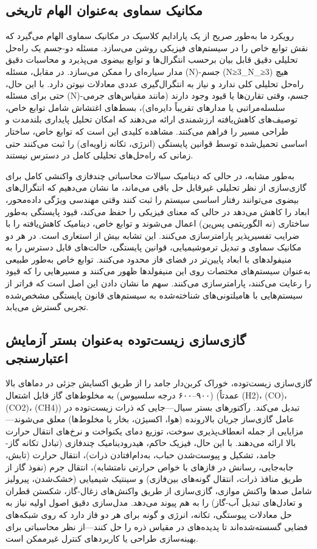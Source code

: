 \documentclass[12pt, a4paper]{article}
\begin{document}
\subsection{مکانیک سماوی به‌عنوان الهام تاریخی}

رویکرد ما به‌طور صریح از یک پارادایم کلاسیک در مکانیک سماوی الهام می‌گیرد که نقش توابع خاص را در سیستم‌های فیزیکی روشن می‌سازد. مسئله دو-جسم یک راه‌حل تحلیلی دقیق قابل بیان برحسب انتگرال‌ها و توابع بیضوی می‌پذیرد و محاسبات دقیق مدار سیاره‌ای را ممکن می‌سازد. در مقابل، مسئله \en(N)-جسم (N≥3\_N\_≥3) هیچ راه‌حل تحلیلی کلی ندارد و نیاز به انتگرال‌گیری عددی معادلات نیوتن دارد. با این حال، حتی برای مسئله \en(N)-جسم، وقتی تقارن‌ها یا قیود وجود دارند (مانند مقیاس‌های جرمی سلسله‌مراتبی یا مدارهای تقریباً دایره‌ای)، بسط‌های اغتشاش شامل توابع خاص، توصیف‌های کاهش‌یافته ارزشمندی ارائه می‌دهند که امکان تحلیل پایداری بلندمدت و طراحی مسیر را فراهم می‌کنند. مشاهده کلیدی این است که توابع خاص، ساختار اساسی تحمیل‌شده توسط قوانین پایستگی (انرژی، تکانه زاویه‌ای) را ثبت می‌کنند حتی زمانی که راه‌حل‌های تحلیلی کامل در دسترس نیستند.

به‌طور مشابه، در حالی که دینامیک سیالات محاسباتی چندفازی واکنشی کامل برای گازی‌سازی از نظر تحلیلی غیرقابل حل باقی می‌ماند، ما نشان می‌دهیم که انتگرال‌های بیضوی می‌توانند رفتار اساسی سیستم را ثبت کنند وقتی مهندسی ویژگی داده‌محور، ابعاد را کاهش می‌دهد در حالی که معنای فیزیکی را حفظ می‌کند، قیود پایستگی به‌طور ساختاری (نه الگوریتمی پس‌ین) اعمال می‌شوند و توابع خاص، دینامیک کاهش‌یافته را با ضرایب تفسیرپذیر پارامترسازی می‌کنند. این تشابه بیش از استعاری است. در هر دو مکانیک سماوی و تبدیل ترموشیمیایی، قوانین پایستگی، حالت‌های قابل دسترس را به منیفولدهای با ابعاد پایین‌تر در فضای فاز محدود می‌کنند. توابع خاص به‌طور طبیعی به‌عنوان سیستم‌های مختصات روی این منیفولدها ظهور می‌کنند و مسیرهایی را که قیود را رعایت می‌کنند، پارامترسازی می‌کنند. سهم ما نشان دادن این اصل است که فراتر از سیستم‌هایی با هامیلتونی‌های شناخته‌شده به سیستم‌های قانون پایستگی مشخص‌شده تجربی گسترش می‌یابد.

\subsection{گازی‌سازی زیست‌توده به‌عنوان بستر آزمایش اعتبارسنجی}

گازی‌سازی زیست‌توده، خوراک کربن‌دار جامد را از طریق اکسایش جزئی در دماهای بالا (۹۰۰–۶۰۰ درجه سلسیوس) به مخلوط‌های گاز قابل اشتعال (عمدتاً \ce(H2)، \ce(CO)، \ce(CO2)، \ce(CH4)) تبدیل می‌کند. رآکتورهای بستر سیال—جایی که ذرات زیست‌توده در عامل گازی‌ساز جریان بالارونده (هوا، اکسیژن، بخار یا مخلوط‌ها) معلق می‌شوند—مزایایی از جمله انعطاف‌پذیری سوخت، توزیع دمای یکنواخت و نرخ‌های انتقال حرارت بالا ارائه می‌دهند. با این حال، فیزیک حاکم، هیدرودینامیک چندفازی (تبادل تکانه گاز-جامد، تشکیل و پیوست‌شدن حباب، به‌دام‌افتادن ذرات)، انتقال حرارت (تابش، جابه‌جایی، رسانش در فازهای با خواص حرارتی نامتشابه)، انتقال جرم (نفوذ گاز از طریق منافذ ذرات، انتقال گونه‌های بین‌فازی) و سینتیک شیمیایی (خشک‌شدن، پیرولیز شامل صدها واکنش موازی، گازی‌سازی از طریق واکنش‌های زغال-گاز، شکستن قطران و تعادل‌های تبدیل آب-گاز) را به هم پیوند می‌دهد. مدل‌سازی دقیق اصول اولیه نیاز به حل معادلات پیوستگی، تکانه، انرژی و گونه برای هر دو فاز دارد که روی شبکه‌های فضایی گسسته‌شده‌اند تا پدیده‌های در مقیاس ذره را حل کنند—از نظر محاسباتی برای بهینه‌سازی طراحی یا کاربردهای کنترل غیرممکن است.
\end{document}
